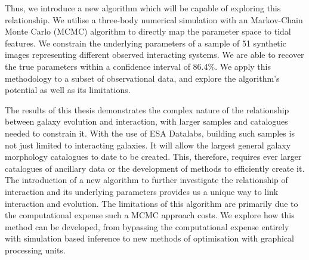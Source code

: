\begin{abstracts}
Thus, we introduce a new algorithm which will be capable of exploring this relationship. We utilise a three-body numerical simulation with an Markov-Chain Monte Carlo (MCMC) algorithm to directly map the parameter space to tidal features. We constrain the underlying parameters of a sample of 51 synthetic images representing different observed interacting systems. We are able to recover the true parameters within a confidence interval of 86.4\%. We apply this methodology to a subset of observational data, and explore the algorithm's potential as well as its limitations.

The results of this thesis demonstrates the complex nature of the relationship between galaxy evolution and interaction, with larger samples and catalogues needed to constrain it. With the use of ESA Datalabs, building such samples is not just limited to interacting galaxies. It will allow the largest general galaxy morphology catalogues to date to be created. This, therefore, requires ever larger catalogues of ancillary data or the development of methods to efficiently create it. The introduction of a new algorithm to further investigate the relationship of interaction and its underlying parameters provides us a unique way to link interaction and evolution. The limitations of this algorithm are primarily due to the computational expense such a MCMC approach costs. We explore how this method can be developed, from bypassing the computational expense entirely with simulation based inference to new methods of optimisation with graphical processing units.

\end{abstracts}



